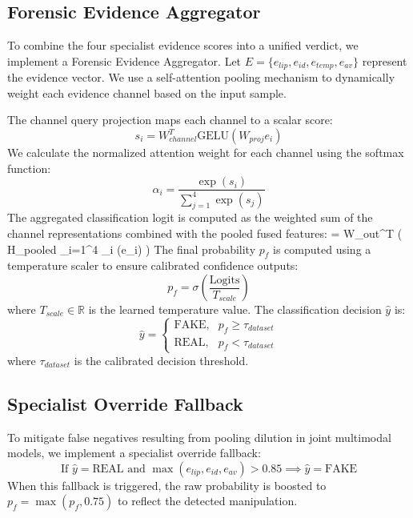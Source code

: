 \documentclass[journal,10pt,onecolumn,draftclsnofoot]{IEEEtran}
\begin{document}
\subsection{Forensic Evidence Aggregator}
To combine the four specialist evidence scores into a unified verdict, we implement a Forensic Evidence Aggregator. Let $E = \{e_{lip}, e_{id}, e_{temp}, e_{av}\}$ represent the evidence vector. We use a self-attention pooling mechanism to dynamically weight each evidence channel based on the input sample.

The channel query projection maps each channel to a scalar score:
\begin{equation}
    s_i = W_{channel}^T \text{GELU}(W_{proj} e_i)
\end{equation}
We calculate the normalized attention weight for each channel using the softmax function:
\begin{equation}
    \alpha_i = \frac{\exp(s_i)}{\sum_{j=1}^4 \exp(s_j)}
\end{equation}
The aggregated classification logit is computed as the weighted sum of the channel representations combined with the pooled fused features:
 = W_{out}^T \left( H_{pooled} \oplus \sum_{i=1}^4 \alpha_i (e_i) \right)
The final probability $p_f$ is computed using a temperature scaler to ensure calibrated confidence outputs:
\begin{equation}
    p_f = \sigma\left(\frac{\text{Logits}}{T_{scale}}\right)
\end{equation}
where $T_{scale} \in \mathbb{R}$ is the learned temperature value. The classification decision $\hat{y}$ is:
\begin{equation}
    \hat{y} = \begin{cases} \text{FAKE}, & p_f \ge \tau_{dataset} \\ \text{REAL}, & p_f < \tau_{dataset} \end{cases}
\end{equation}
where $\tau_{dataset}$ is the calibrated decision threshold.

\subsection{Specialist Override Fallback}
To mitigate false negatives resulting from pooling dilution in joint multimodal models, we implement a specialist override fallback:
\begin{equation}
    \text{If } \hat{y} = \text{REAL} \text{ and } \max(e_{lip}, e_{id}, e_{av}) > 0.85 \implies \hat{y} = \text{FAKE}
\end{equation}
When this fallback is triggered, the raw probability is boosted to $p_f = \max(p_f, 0.75)$ to reflect the detected manipulation.
\end{document}
